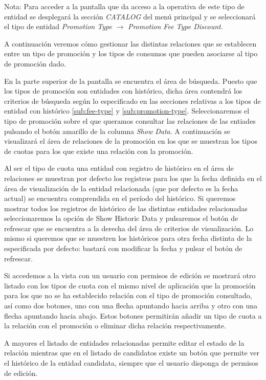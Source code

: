 Nota: Para acceder a la pantalla que da acceso a la operativa de este tipo de entidad se desplegará la sección \emph{CATALOG} del menú principal y se seleccionará el tipo de entidad \emph{Promotion Type} $\rightarrow$  \emph{Promotion Fee Type Discount}.


A continuación veremos cómo gestionar las distintas relaciones que se establecen entre un tipo de promoción y los tipos de consumos que pueden asociarse al tipo de promoción dado.


En la parte superior de la pantalla se encuentra el área de búsqueda. Puesto que los tipos de promoción son entidades con histórico, dicha área contendrá los criterios de búsqueda según lo especificado en las secciones relativas a los tipos de entidad con histórico \ref{sub:fee-type} y \ref{sub:promotion-type}. 
Seleccionaremos el tipo de promoción sobre el que queramos consultar las relaciones de las entiades pulsando el botón amarillo de la columna \emph{Show Data}. A continuación se visualizará el área de relaciones de la promoción en los que se muestran los tipos de cuotas para los que existe una relación con la promoción.


Al ser el tipo de cuota una entidad con registro de histórico en el área de relaciones se muestran por defecto los registros para los que la fecha definida en el área de visualización de la entidad relacionada (que por defecto es la fecha actual) se encuentra comprendida en el período del histórico. Si queremos mostrar todos los registros de histórico de las distintas entidades relacionadas seleccionaremos la opción de Show Historic Data y pulsaremos el botón de refrescar que se encuentra a la derecha del área de criterios de visualización. Lo mismo si queremos que se muestren los históricos para otra fecha distinta de la especificada por defecto: bastará con modificar la fecha y pulsar el botón de refrescar.

Si accedemos a la vista con un usuario con permisos de edición se mostrará otro listado con los tipos de cuota con el mismo nivel de aplicación que la promoción para los que no se ha establecido relación con el tipo de promoción consultado, así como dos botones, uno con una flecha apuntando hacia arriba y otro con una flecha apuntando hacia abajo. Estos botones permitirán añadir un tipo de cuota a la relación con el promoción o eliminar dicha relación respectivamente. 

A mayores el listado de entidades relacionadas permite editar el estado de la relación mientras que en el listado de candidatos existe un botón que permite ver el histórico de la entidad candidata, siempre que el usuario disponga de permisos de edición.


